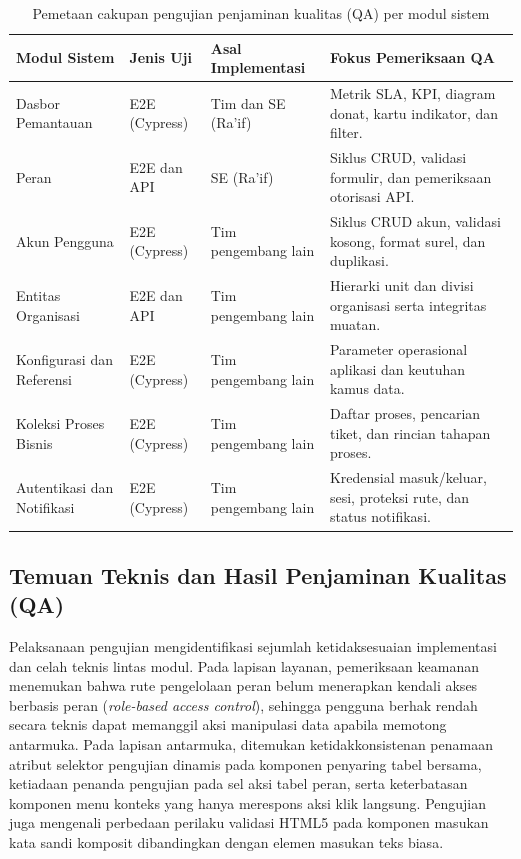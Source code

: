 \begin{table}[htbp]
\caption{Pemetaan cakupan pengujian penjaminan kualitas (QA) per modul sistem}\label{tab:qa-cakupan-bab3}
\small
\begin{tabularx}{\textwidth}{@{}P{3.0cm}P{2.5cm}P{3.0cm}Y@{}}
\toprule\textbf{Modul Sistem} & \textbf{Jenis Uji} & \textbf{Asal Implementasi} & \textbf{Fokus Pemeriksaan QA}\\\midrule
Dasbor Pemantauan & E2E (Cypress) & Tim dan SE (Ra'if) & Metrik SLA, KPI, diagram donat, kartu indikator, dan filter.\\
Peran & E2E dan API & SE (Ra'if) & Siklus CRUD, validasi formulir, dan pemeriksaan otorisasi API.\\
Akun Pengguna & E2E (Cypress) & Tim pengembang lain & Siklus CRUD akun, validasi kosong, format surel, dan duplikasi.\\
Entitas Organisasi & E2E dan API & Tim pengembang lain & Hierarki unit dan divisi organisasi serta integritas muatan.\\
Konfigurasi dan Referensi & E2E (Cypress) & Tim pengembang lain & Parameter operasional aplikasi dan keutuhan kamus data.\\
Koleksi Proses Bisnis & E2E (Cypress) & Tim pengembang lain & Daftar proses, pencarian tiket, dan rincian tahapan proses.\\
Autentikasi dan Notifikasi & E2E (Cypress) & Tim pengembang lain & Kredensial masuk/keluar, sesi, proteksi rute, dan status notifikasi.\\
\bottomrule
\end{tabularx}
\end{table}

\subsection{Temuan Teknis dan Hasil Penjaminan Kualitas (QA)}
Pelaksanaan pengujian mengidentifikasi sejumlah ketidaksesuaian implementasi dan celah teknis lintas modul. Pada lapisan layanan, pemeriksaan keamanan menemukan bahwa rute pengelolaan peran belum menerapkan kendali akses berbasis peran (\textit{role-based access control}), sehingga pengguna berhak rendah secara teknis dapat memanggil aksi manipulasi data apabila memotong antarmuka. Pada lapisan antarmuka, ditemukan ketidakkonsistenan penamaan atribut selektor pengujian dinamis pada komponen penyaring tabel bersama, ketiadaan penanda pengujian pada sel aksi tabel peran, serta keterbatasan komponen menu konteks yang hanya merespons aksi klik langsung. Pengujian juga mengenali perbedaan perilaku validasi HTML5 pada komponen masukan kata sandi komposit dibandingkan dengan elemen masukan teks biasa.

